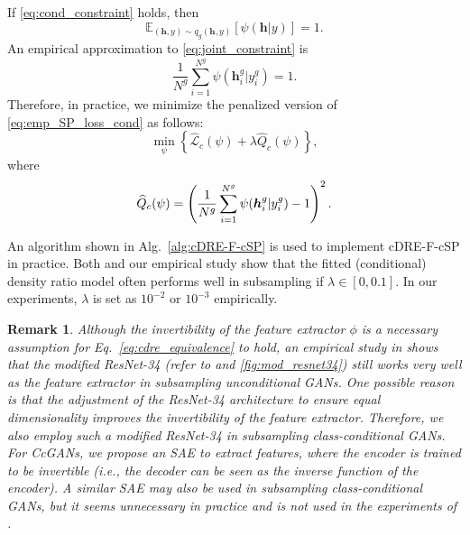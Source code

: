 \documentclass[final,12pt, 3p,times]{elsarticle}
\newcommand\scalemath[2]{\scalebox{#1}{\mbox{\ensuremath{\displaystyle #2}}}}  \def\todo#1{\textcolor{red}{#1}}
\newtheorem{remark}{Remark}
\begin{document}
If \cref{eq:cond_constraint} holds, then
\begin{equation}
	\label{eq:joint_constraint}
	\mathbb{E}_{(\bm{h},y)\sim q_g(\bm{h},y)} [\psi(\bm{h}|y)] = 1.
\end{equation}
An empirical approximation to \cref{eq:joint_constraint} is
\begin{equation}
	\label{eq:emp_joint_constraint}
	\frac{1}{N^g}\sum_{i=1}^{N^g} \psi(\bm{h}_i^g|y_i^g) = 1.
\end{equation}
Therefore, in practice, we minimize the penalized version of \cref{eq:emp_SP_loss_cond} as follows:
\begin{equation}
	\label{eq:penalized_SP_loss_cond}
	\min_{\psi}\left\{ \widehat{\mathcal{L}}_c(\psi) + \lambda\widehat{Q}_c(\psi) \right\},
\end{equation}
where 
\begin{equation}
	\label{eq:penalty_Q_cond}
	\scalemath{1}{
		\widehat{Q}_c(\psi) = \left(\frac{1}{N^g}\sum_{i=1}^{N^g} \psi(\bm{h}_i^g|y_i^g) - 1 \right)^2.
	}
\end{equation}


An algorithm shown in Alg.\ \ref{alg:cDRE-F-cSP} is used to implement cDRE-F-cSP in practice. Both \cite{ding2020subsampling} and our empirical study show that the fitted (conditional) density ratio model often performs well in subsampling if $\lambda\in[0,0.1]$. In our experiments, $\lambda$ is set as $10^{-2}$ or $10^{-3}$ empirically. 

\begin{remark}
	Although the invertibility of the feature extractor $\phi$ is a necessary assumption for Eq.\ \eqref{eq:cdre_equivalence} to hold, an empirical study in \cite{ding2020subsampling} shows that the modified ResNet-34 (refer to  and \cref{fig:mod_resnet34}) still works very well as the feature extractor in subsampling unconditional GANs. One possible reason is that the adjustment of the ResNet-34 architecture to ensure equal dimensionality improves the invertibility of the feature extractor. Therefore, we also employ such a modified ResNet-34 in subsampling class-conditional GANs. For CcGANs, we propose an SAE to extract features, where the encoder is trained to be invertible (i.e., the decoder can be seen as the inverse function of the encoder). A similar SAE may also be used in subsampling class-conditional GANs, but it seems unnecessary in practice and is not used in the experiments of .
\end{remark}
\end{document}
